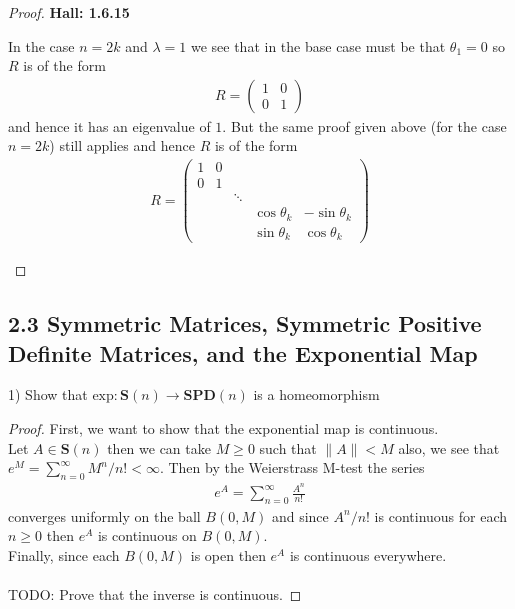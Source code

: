 \documentclass[11pt]{article}
\theoremstyle{definition}
\begin{document}
\begin{proof}{\textbf{Hall: 1.6.15}}
\begin{itemize}
    In the case $n = 2k$ and $\lambda= 1$ we see that in the base case must be
    that $\theta_1 = 0$ so $R$ is of the form
    \begin{align*}
        R = \begin{pmatrix} 1 & 0 \\ 0 & 1 \end{pmatrix}
    \end{align*}
    and hence it has an eigenvalue of $1$.
    But the same proof given above (for the case $n=2k$) still applies and
    hence $R$ is of the form 
    \begin{align*}
        R = \begin{pmatrix}
            1 & 0  &        &        & \\
            0 & 1  &        &        & \\
                   &        & \ddots &                & \\
                   &        &        & \cos\theta_{k} & -\sin\theta_{k} \\
                   &        &        & \sin\theta_{k} & \cos\theta_{k}
        \end{pmatrix}
    \end{align*}
\end{itemize}
\end{proof}

\cleardoublepage
\subsection*{2.3 Symmetric Matrices, Symmetric Positive Definite Matrices, and
the Exponential Map}
1) Show that $\text{exp}:\bm{S}(n) \to \bm{SPD}(n)$ is a homeomorphism
\begin{proof}{}
    First, we want to show that the exponential map is continuous.\\
    Let $A \in \bm{S}(n)$ then we can take $M \geq 0$ such that
    $\|A\| < M$ also, we see that $e^M = \sum_{n=0}^\infty M^n/n! < \infty$.
    Then by the Weierstrass M-test the series
    \begin{align*}
        e^A = \sum_{n=0}^\infty \frac{A^n}{n!}
    \end{align*}
    converges uniformly on the ball $B(0, M)$ and since $A^n/n!$ is continuous
    for each $n \geq 0$ then $e^A$ is continuous on $B(0, M)$.\\
    Finally, since each $B(0,M)$ is open then $e^A$ is continuous everywhere.
    \\\\
    TODO: Prove that the inverse is continuous.

\end{proof}
\end{document}
